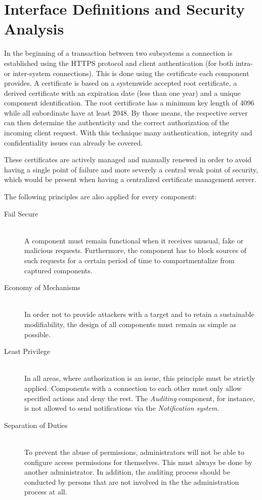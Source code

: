 \documentclass[12pt,a4paper,titlepage,oneside]{scrartcl}
\begin{document}
\section{Interface Definitions and Security Analysis}
In the beginning of a transaction between two subsystems a connection  is established using the HTTPS protocol and client authentication (for both intra- or inter-system connections). This is done using the certificate each component provides. A certificate is based on a systemwide accepted root certificate, a derived certificate with an expiration date (less than one year) and a unique component identification. The root certificate has a minimum key length of 4096 while all subordinate have at least 2048. By those means, the respective server can then determine the authenticity and the correct authorization of the incoming client request. With this technique many authentication, integrity and confidentiality issues can already be covered.

These certificates are actively managed and manually renewed in order to avoid having a single point of failure and more severely a central weak point of security, which would be present when having a centralized certificate management server.

The following principles are also applied for every component:

\begin{description}
  \item[Fail Secure] \hfill \\
  A component must remain functional when it receives unusual, fake or malicious requests. Furthermore, the component has to block sources of such requests for a certain period of time to compartmentalize from captured components.
  \item[Economy of Mechanisms] \hfill \\
  In order not to provide attackers with a target and to retain a sustainable modifiability, the design of all components must remain as simple as possible.
  \item[Least Privilege] \hfill \\
  In all areas, where authorization is an issue, this principle must be strictly applied. Components with a connection to each other must only allow specified actions and deny the rest. The \emph{Auditing} component, for instance, is not allowed to send notifications via the \emph{Notification system}.
  \item[Separation of Duties] \hfill \\
  To prevent the abuse of permissions, administrators will not be able to configure access permissions for themselves. This must always be done by another administrator. In addition, the auditing process should be conducted by persons that are not involved in the the administration process at all.
\end{description}
\end{document}
